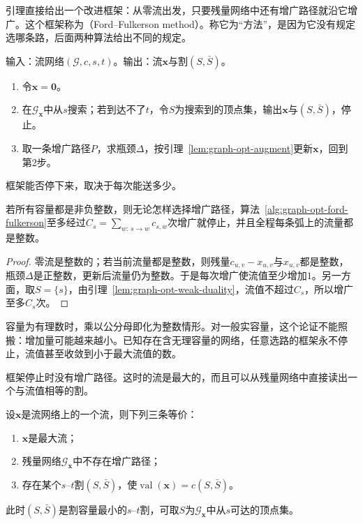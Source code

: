 引理直接给出一个改进框架：从零流出发，只要残量网络中还有增广路径就沿它增广。这个框架称为（Ford--Fulkerson method）。称它为“方法”，是因为它没有规定选哪条路，后面两种算法给出不同的规定。

\begin{algorithm}
\label{alg:graph-opt-ford-fulkerson}
输入：流网络$(\mathcal G,c,s,t)$。输出：流$\bm x$与割$(S,\bar S)$。
\begin{enumerate}
  \item 令$\bm x=\bm 0$。
  \item 在$\mathcal G_{\bm x}$中从$s$搜索；若到达不了$t$，令$S$为搜索到的顶点集，输出$\bm x$与$(S,\bar S)$，停止。
  \item 取一条增广路径$P$，求瓶颈$\Delta$，按引理~\ref{lem:graph-opt-augment}更新$\bm x$，回到第2步。
\end{enumerate}
\end{algorithm}

框架能否停下来，取决于每次能送多少。

\begin{theorem}[整数容量下的有限终止]
\label{thm:graph-opt-integer-termination}
若所有容量都是非负整数，则无论怎样选择增广路径，算法~\ref{alg:graph-opt-ford-fulkerson}至多经过$C_s=\sum_{w:\,s\to w}c_{s,w}$次增广就停止，并且全程每条弧上的流量都是整数。
\end{theorem}

\begin{proof}
零流是整数的；若当前流量都是整数，则残量$c_{u,v}-x_{u,v}$与$x_{u,v}$都是整数，瓶颈$\Delta$是正整数，更新后流量仍为整数。于是每次增广使流值至少增加$1$。另一方面，取$S=\{s\}$，由引理~\ref{lem:graph-opt-weak-duality}，流值不超过$C_s$，所以增广至多$C_s$次。
\end{proof}

容量为有理数时，乘以公分母即化为整数情形。对一般实容量，这个论证不能照搬：增加量可能越来越小。已知存在含无理容量的网络，任意选路的框架永不停止，流值甚至收敛到小于最大流值的数。

框架停止时没有增广路径。这时的流是最大的，而且可以从残量网络中直接读出一个与流值相等的割。

\begin{theorem}[增广路径判据]
\label{thm:graph-opt-augmenting-path}
设$\bm x$是流网络上的一个流，则下列三条等价：
\begin{enumerate}
  \item $\bm x$是最大流；
  \item 残量网络$\mathcal G_{\bm x}$中不存在增广路径；
  \item 存在某个$s$--$t$割$(S,\bar S)$，使$\operatorname{val}(\bm x)=c(S,\bar S)$。
\end{enumerate}
此时$(S,\bar S)$是割容量最小的$s$--$t$割，可取$S$为$\mathcal G_{\bm x}$中从$s$可达的顶点集。
\end{theorem}

